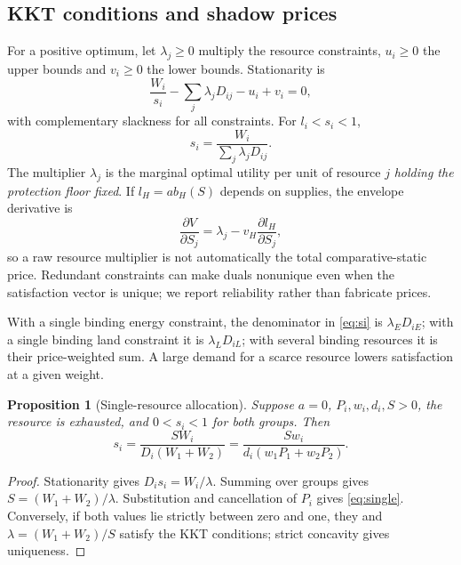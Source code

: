 \documentclass[11pt]{article}
\newtheorem{proposition}{Proposition}
\begin{document}
\subsection{KKT conditions and shadow prices}
For a positive optimum, let $\lambda_j\ge0$ multiply the resource constraints, $u_i\ge0$ the upper bounds and $v_i\ge0$ the lower bounds. Stationarity is
\begin{equation}
\frac{W_i}{s_i}-\sum_j\lambda_jD_{ij}-u_i+v_i=0,
\label{eq:kkt}
\end{equation}
with complementary slackness for all constraints. For $l_i<s_i<1$,
\begin{equation}
s_i=\frac{W_i}{\sum_j\lambda_jD_{ij}}.
\label{eq:si}
\end{equation}
The multiplier $\lambda_j$ is the marginal optimal utility per unit of resource $j$ \emph{holding the protection floor fixed}. If $l_H=a b_H(S)$ depends on supplies, the envelope derivative is
\begin{equation}
\frac{\partial V}{\partial S_j}=\lambda_j-v_H\frac{\partial l_H}{\partial S_j},
\label{eq:envelope}
\end{equation}
so a raw resource multiplier is not automatically the total comparative-static price. Redundant constraints can make duals nonunique even when the satisfaction vector is unique; we report reliability rather than fabricate prices.

With a single binding energy constraint, the denominator in \eqref{eq:si} is $\lambda_ED_{iE}$; with a single binding land constraint it is $\lambda_LD_{iL}$; with several binding resources it is their price-weighted sum. A large demand for a scarce resource lowers satisfaction at a given weight.

\begin{proposition}[Single-resource allocation]
Suppose $a=0$, $P_i,w_i,d_i,S>0$, the resource is exhausted, and $0<s_i<1$ for both groups. Then
\begin{equation}
s_i=\frac{SW_i}{D_i(W_1+W_2)}
=\frac{Sw_i}{d_i(w_1P_1+w_2P_2)}.
\label{eq:single}
\end{equation}
\end{proposition}
\begin{proof}
Stationarity gives $D_is_i=W_i/\lambda$. Summing over groups gives $S=(W_1+W_2)/\lambda$. Substitution and cancellation of $P_i$ gives \eqref{eq:single}. Conversely, if both values lie strictly between zero and one, they and $\lambda=(W_1+W_2)/S$ satisfy the KKT conditions; strict concavity gives uniqueness.
\end{proof}
\end{document}
